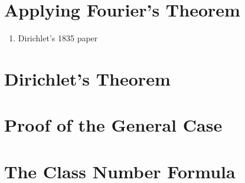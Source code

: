 \noindent\td 

\section{Applying Fourier's Theorem}

\td

\begin{enumerate}
    \item Dirichlet's 1835 paper
\end{enumerate}

\noindent\td 

\section{Dirichlet's Theorem}

\td 

\section{Proof of the General Case}

\td 

\section{The Class Number Formula}

\td